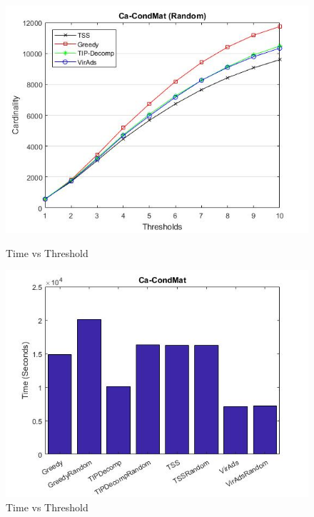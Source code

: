 \begin{figure}[h!]
\begin{minipage}[t]{0.50\textwidth}
\includegraphics[width=\linewidth,keepaspectratio=true]{images/ca-condmatresultrandom.jpg}
\caption{Time vs Threshold}

\end{minipage}
\begin{minipage}[t]{0.50\textwidth}
\includegraphics[width=\linewidth,keepaspectratio=true]{images/condmattime.jpg}
\caption{Time vs Threshold}
\end{minipage}
\end{figure}

